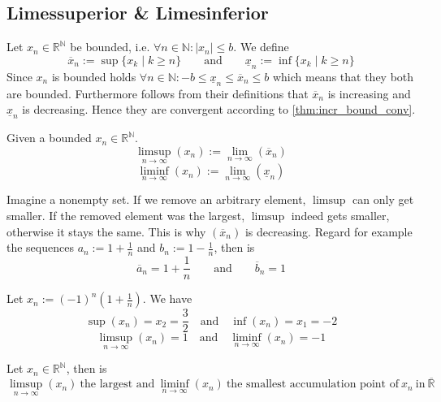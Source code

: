 \subsection{Limessuperior \& Limesinferior}
Let \(x_n \in \mathbb{R}^\mathbb{N}\) be bounded, i.e. \(\forall n \in \mathbb{N}: |x_n| \leq b\).
We define
\[\overline{x}_n := \sup\{x_k \mid k \geq n\} \qquad\text{and}\qquad \underline{x}_n := \inf\{x_k \mid k \geq n\}\]
Since \(x_n\) is bounded holds \(\forall n \in \mathbb{N}: -b \leq \underline{x}_n \leq \overline{x}_n \leq b\) which means that they both are bounded.
Furthermore follows from their definitions that \(\overline{x}_n\) is increasing and \(\underline{x}_n\) is decreasing.
Hence they are convergent according to \cref{thm:incr_bound_conv}.

\begin{definition}
   Given a bounded \(x_n \in \mathbb{R}^\mathbb{N}\).
   \[\limsup_{n \to \infty}(x_n) := \lim_{n \to \infty}(\overline{x}_n)\]
   \[\liminf_{n \to \infty}(x_n) := \lim_{n \to \infty}(\underline{x}_n)\]
\end{definition}
\begin{remark}[Intuition]
   Imagine a nonempty set.
   If we remove an arbitrary element, \(\limsup\) can only get smaller.
   If the removed element was the largest, \(\limsup\) indeed gets smaller, otherwise it stays the same.
   This is why \((\overline{x}_n)\) is decreasing.
   Regard for example the sequences \(a_n := 1 + \frac{1}{n}\) and \(b_n := 1 - \frac{1}{n}\), then is
   \[\overline{a}_n = 1 + \frac{1}{n} \qquad\text{and}\qquad \overline{b}_n = 1\]
\end{remark}
\begin{example}
   Let \(x_n := (-1)^n \left(1 + \frac{1}{n}\right)\).
   We have
   \[\sup(x_n) = x_2 = \frac{3}{2} \quad\text{and}\quad \inf(x_n) = x_1 = -2\]
   \[\limsup_{n \to \infty}(x_n) = 1 \quad\text{and}\quad \liminf_{n \to \infty}(x_n) = -1\]
\end{example}

\begin{theorem}
   Let \(x_n \in \mathbb{R}^\mathbb{N}\), then is
   \[\limsup_{n \to \infty}(x_n)~\text{the largest and}~\liminf_{n \to \infty}(x_n)~\text{the smallest accumulation point of}~x_n~\text{in}~\overline{\mathbb{R}}\]
\end{theorem}

